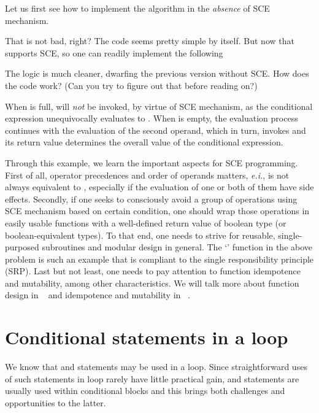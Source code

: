 Let us first see how to implement the algorithm in the \emph{absence} of SCE mechanism.

That is not bad, right?
The code seems pretty simple by itself.
But now that \java ~ supports SCE, so one can readily implement the following

The logic is much cleaner, dwarfing the previous version without SCE\@.
How does the code work?
(Can you try to figure out that before reading on?)


When  is full,  will \emph{not} be invoked, by virtue of SCE
mechanism, as the conditional expression unequivocally evaluates to .
When  is empty, the evaluation process continues with the evaluation of
the second operand, which in turn, invokes  and its return value determines the
overall value of the conditional expression.


Through this example, we learn the important aspects for SCE programming.
First of all, operator precedences and order of operands matters, \textit{e.i.},  is
not always equivalent to
, especially if the evaluation of one or both of them have side effects.
Secondly, if one seeks to consciously avoid a group of operations using SCE
mechanism based on certain condition,
one should wrap those operations in easily usable functions
with a well-defined return value of boolean type (or boolean-equivalent types).
To that end, one needs to strive for reusable, single-purposed
subroutines and modular design in general.
The `' function in the above problem is such an example that is compliant to the
single responsibility principle (SRP).
Last but not least, one needs to pay attention to function idempotence and mutability, among
other characteristics.
We will talk more about function design in ~ and
idempotence and mutability in ~.


\section{Conditional statements in a loop}\label{sec:branchinginloop}

%    

We know that  and  statements may be used in a loop.
Since straightforward uses of such statements in loop rarely have little practical gain,
 and  statements are usually used within conditional blocks and this
brings both challenges and opportunities to the latter.

